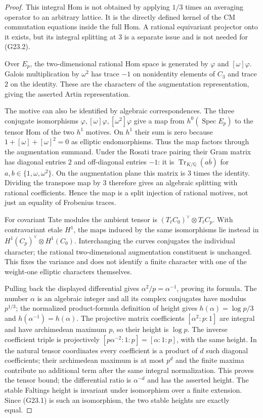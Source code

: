 \begin{proof}
This integral Hom is not obtained by applying $1/3$ times an
averaging operator to an arbitrary lattice.  It is the directly
defined kernel of the CM commutation equations inside the full Hom.
A rational equivariant projector onto it exists, but its integral
splitting at $3$ is a separate issue and is not needed for (G23.2).

Over $E_p$, the two-dimensional rational Hom space is generated by
$\varphi$ and $[\omega]\varphi$.  Galois multiplication by
$\omega^2$ has trace $-1$ on nonidentity elements of $C_3$ and trace
$2$ on the identity.  These are the characters of the augmentation
representation, giving the asserted Artin representation.

The motive can also be identified by algebraic correspondences.
The three conjugate isomorphisms
$\varphi,[\omega]\varphi,[\omega^2]\varphi$ give a map from
$h^0(\operatorname{Spec}E_p)$ to the tensor Hom of the two $h^1$
motives.  On $h^1$ their sum is zero because
$1+[\omega]+[\omega]^2=0$ as elliptic endomorphisms.
Thus the map factors through the augmentation summand.  Under the
Rosati trace pairing their Gram matrix has diagonal entries $2$ and
off-diagonal entries $-1$: it is
$\operatorname{Tr}_{K/\mathbb Q}(a\overline b)$ for
$a,b\in\{1,\omega,\omega^2\}$.  On the augmentation plane this
matrix is $3$ times the identity.  Dividing the transpose map by $3$
therefore gives an algebraic splitting with rational coefficients.  Hence the map
is a split injection of rational motives, not just an equality of
Frobenius traces.

For covariant Tate modules the ambient tensor is
$(T_\ell C_0)^\vee\otimes T_\ell C_p$.
With contravariant etale $H^1$, the maps induced by the same
isomorphisms lie instead in
$H^1(C_p)^\vee\otimes H^1(C_0)$.
Interchanging the curves conjugates the individual character; the
rational two-dimensional augmentation constituent is unchanged.
This fixes the variance and does not identify a finite character
with one of the weight-one elliptic characters themselves.

Pulling back the displayed differential gives
$\alpha^2/p=\alpha^{-1}$, proving its formula.  The number
$\alpha$ is an algebraic integer and all its complex conjugates
have modulus $p^{1/3}$; the normalized product-formula definition of
height gives $h(\alpha)=\log p/3$ and
$h(\alpha^{-1})=h(\alpha)$.
The projective matrix coefficients $[\alpha^2:p:1]$ are integral
and have archimedean maximum $p$, so their height is $\log p$.
The inverse coefficient triple is projectively
$[p\alpha^{-2}:1:p]=[\alpha:1:p]$, with the same height.
In the natural tensor coordinates every coefficient is a product
of $d$ such diagonal coefficients; their archimedean maximum is at
most $p^d$ and the finite maxima contribute no additional term after
the same integral normalization.  This proves the tensor bound;
the differential ratio is $\alpha^{-d}$ and has the asserted
height.  The stable Faltings height is invariant under isomorphism
over a finite extension.  Since (G23.1) is such an isomorphism,
the two stable heights are exactly equal.


\end{proof}
